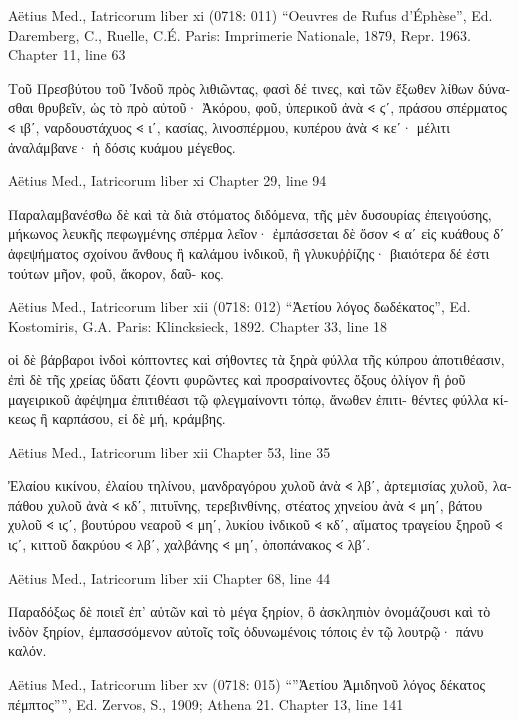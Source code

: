 \documentclass[12pt,letterpaper,twoside,final]{memoir}
\begin{document}
\begin{greek}
Aëtius Med., Iatricorum liber xi (0718: 011)
“Oeuvres de Rufus d'Éphèse”, Ed. Daremberg, C., Ruelle, C.É.
Paris: Imprimerie Nationale, 1879, Repr. 1963.
Chapter 11, line 63

Τοῦ Πρεσβύτου τοῦ Ἰνδοῦ πρὸς λιθιῶντας, φασὶ δέ τινες, καὶ τῶν ἔξωθεν λίθων 
δύνασθαι θρυβεῖν, ὡς τὸ πρὸ αὐτοῦ· Ἀκόρου, φοῦ, ὑπερικοῦ ἀνὰ 𐅻 ϛʹ, πράσου 
σπέρματος 𐅻 ιβʹ, ναρδουστάχυος 𐅻 ιʹ, κασίας, λινοσπέρμου, κυπέρου ἀνὰ 𐅻 κεʹ· 
μέλιτι ἀναλάμβανε· ἡ δόσις κυάμου μέγεθος. 



Aëtius Med., Iatricorum liber xi 
Chapter 29, line 94

                                                         Παραλαμβανέσθω δὲ καὶ τὰ διὰ 
στόματος διδόμενα, τῆς μὲν δυσουρίας ἐπειγούσης, μήκωνος λευκῆς πεφωγμένης 
σπέρμα λεῖον· ἐμπάσσεται δὲ ὅσον 𐅻 αʹ εἰς κυάθους δʹ ἀφεψήματος σχοίνου ἄνθους ἢ 
καλάμου ἰνδικοῦ, ἢ γλυκυῤῥίζης· βιαιότερα δέ ἐστι τούτων μῆον, φοῦ, ἄκορον, δαῦ-
κος. 



Aëtius Med., Iatricorum liber xii (0718: 012)
“Ἀετίου λόγος δωδέκατος”, Ed. Kostomiris, G.A.
Paris: Klincksieck, 1892.
Chapter 33, line 18

                                                               οἱ δὲ βάρβαροι ἰνδοὶ 
κόπτοντες καὶ σήθοντες τὰ ξηρὰ φύλλα τῆς κύπρου ἀποτιθέασιν, ἐπὶ δὲ 
τῆς χρείας ὕδατι ζέοντι φυρῶντες καὶ προσραίνοντες ὄξους ὀλίγον ἢ ῥοῦ 
μαγειρικοῦ ἀφέψημα ἐπιτιθέασι τῷ φλεγμαίνοντι τόπῳ, ἄνωθεν ἐπιτι-
θέντες φύλλα κίκεως ἢ καρπάσου, εἰ δὲ μή, κράμβης. 



Aëtius Med., Iatricorum liber xii 
Chapter 53, line 35

        Ἐλαίου κικίνου, ἐλαίου τηλίνου, μανδραγόρου χυλοῦ ἀνὰ 𐅻 λβʹ, 
ἀρτεμισίας χυλοῦ, λαπάθου χυλοῦ ἀνὰ 𐅻 κδʹ, πιτυΐνης, τερεβινθίνης, 
στέατος χηνείου ἀνὰ 𐅻 μηʹ, βάτου χυλοῦ 𐅻 ιϛʹ, βουτύρου νεαροῦ 𐅻 μηʹ, 
λυκίου ἰνδικοῦ 𐅻 κδʹ, αἵματος τραγείου ξηροῦ 𐅻 ιϛʹ, κιττοῦ δακρύου 
𐅻 λβʹ, χαλβάνης 𐅻 μηʹ, ὀποπάνακος 𐅻 λβʹ. 



Aëtius Med., Iatricorum liber xii 
Chapter 68, line 44

      Παραδόξως δὲ ποιεῖ ἐπ' αὐτῶν καὶ τὸ μέγα ξηρίον, ὃ ἀσκληπιὸν 
ὀνομάζουσι καὶ τὸ ἰνδὸν ξηρίον, ἐμπασσόμενον αὐτοῖς τοῖς ὀδυνωμένοις 
τόποις ἐν τῷ λουτρῷ· πάνυ καλόν. 



Aëtius Med., Iatricorum liber xv (0718: 015)
“”Ἀετίου Ἀμιδηνοῦ λόγος δέκατος πέμπτος””, Ed. Zervos, S., 1909; Athena 21.
Chapter 13, line 141


\end{greek}
\end{document}
